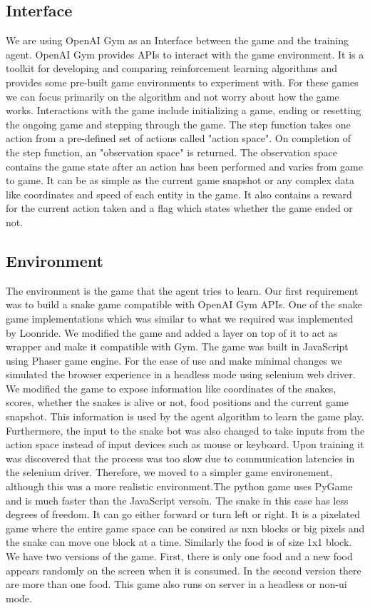 \documentclass[conference,10pt]{IEEEtran}
\begin{document}
	\subsection{Interface}
	We are using OpenAI Gym\cite{sd3} as an Interface between the game and the training agent. OpenAI Gym provides APIs to interact with the game environment. It is a toolkit for developing and comparing reinforcement learning algorithms and provides some pre-built game environments to experiment with. For these games we can focus primarily on the algorithm and not worry about how the game works. Interactions with the game include initializing a game, ending or resetting the ongoing game and stepping through the game. The step function takes one action from a pre-defined set of actions called "action space". On completion of the step function, an "observation space" is returned. The observation space contains the game state after an action has been performed and varies from game to game. It can be as simple as the current game snapshot  or any complex data like coordinates and speed of each entity in the game. It also contains a reward for the current action taken and a flag which states whether the game ended or not.
	\subsection{Environment}
	The environment is the game that the agent tries to learn. Our first requirement was to build a snake game compatible with OpenAI Gym APIs. One of the snake game implementations which was similar to what we required was implemented by Loonride\cite{sd4}. We modified the game and added a layer on top of it to act as wrapper and make it compatible with Gym. The game was built in JavaScript using Phaser game engine. For the ease of use and make minimal changes we simulated the browser experience in a headless mode using selenium web driver.
	\break
	\break
	We modified the game to expose information like coordinates of the snakes, scores, whether the snakes is alive or not, food positions and the current game snapshot. This information is used by the agent algorithm to learn the game play. Furthermore, the input to the snake bot was also changed to take inputs from the action space instead of input devices such as mouse or keyboard.
	\break
	Upon training it was discovered that the process was too slow due to communication latencies in the selenium driver. Therefore, we moved to a simpler game environement, although this was a more realistic environment.The python game uses PyGame and is much faster than the JavaScript versoin. The snake in this case has less degrees of freedom. It can go either forward or turn left or right. It is a pixelated game where the entire game space can be consired as nxn blocks or big pixels and the snake can move one block at a time. Similarly the food is of size 1x1 block. We have two versions of the game. First, there is only one food and a new food appears randomly on the screen when it is consumed. In the second version there are more than one food. This game also runs on server in a headless or non-ui mode.
\end{document}
